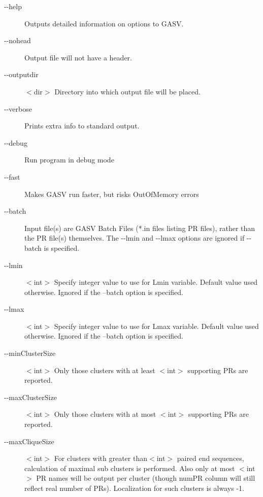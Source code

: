 \documentclass[11pt]{article}
\begin{document}
\begin{description}
\item[-{}-help] 	Outputs detailed information on options to GASV.

\item[-{}-nohead] 	Output file will not have a header.
        
\item[-{}-outputdir]  $<$dir$>$  Directory into which output file will be placed.
         
\item[-{}-verbose] Prints extra info to standard output.  
    
\item[-{}-debug] Run program in debug mode 

\item[-{}-fast]      Makes GASV run faster, but risks OutOfMemory errors

\item[-{}-batch]      		 Input file(s) are GASV Batch Files (*.in files listing PR files), rather than the PR file(s) themselves. The -{}-lmin and -{}-lmax options are ignored if -{}-batch is specified. 
   
\item[-{}-lmin]       $<$int$>$		Specify integer value to use for Lmin
				variable. Default value used otherwise. Ignored
				if the --batch option is specified.
   

\item[-{}-lmax ]        $<$int$>$	Specify integer value to use for Lmax variable.
				Default value used otherwise. Ignored if the 
				--batch option is specified.
  
\item[-{}-minClusterSize]     $<$int$>$ Only
				those clusters with at least $<$int$>$ supporting
				PRs are reported.

\item[-{}-maxClusterSize] $<$int$>$ Only those
				clusters with at most $<$int$>$ supporting PRs are
				reported.

\item[-{}-maxCliqueSize]       $<$int$>$ For
				clusters with greater than$<$int$>$ paired end
                                sequences, calculation of maximal sub clusters
                                is performed.
                               	Also only at most $<$int$>$ PR names will be
				output per cluster (though numPR column will
                                still reflect real number of PRs).
                                Localization for such clusters is always -1.
                                

\end{description}
\end{document}
